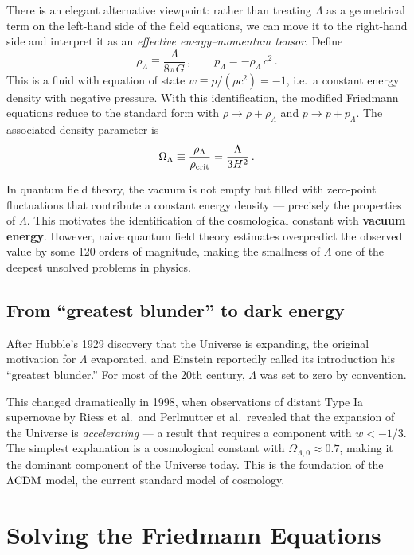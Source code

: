 There is an elegant alternative viewpoint: rather than treating $\Lambda$ as a geometrical term on the left-hand side of the field equations, we can move it to the right-hand side and interpret it as an \emph{effective energy--momentum tensor}. Define
\begin{equation}
    \rho_\Lambda \equiv \frac{\Lambda}{8\pi G}\,, \qquad p_\Lambda = -\rho_\Lambda\, c^2\,.
\end{equation}
This is a fluid with equation of state $w \equiv p/(\rho c^2) = -1$, i.e.\ a constant energy density with negative pressure. With this identification, the modified Friedmann equations reduce to the standard form with $\rho\to\rho+\rho_\Lambda$ and $p\to p+p_\Lambda$. The associated density parameter is
\begin{equation}
    \Omega_\Lambda \equiv \frac{\rho_\Lambda}{\rho_{\rm crit}} = \frac{\Lambda}{3H^2}\,.
\end{equation}

In quantum field theory, the vacuum is not empty but filled with zero-point fluctuations that contribute a constant energy density --- precisely the properties of $\Lambda$. This motivates the identification of the cosmological constant with \textbf{vacuum energy}. However, naive quantum field theory estimates overpredict the observed value by some 120 orders of magnitude, making the smallness of $\Lambda$ one of the deepest unsolved problems in physics.

\subsection*{From ``greatest blunder'' to dark energy}

After Hubble's 1929 discovery that the Universe is expanding, the original motivation for $\Lambda$ evaporated, and Einstein reportedly called its introduction his ``greatest blunder.'' For most of the 20th century, $\Lambda$ was set to zero by convention.

This changed dramatically in 1998, when observations of distant Type Ia supernovae by Riess et al.\ and Perlmutter et al.\ revealed that the expansion of the Universe is \emph{accelerating} --- a result that requires a component with $w<-1/3$. The simplest explanation is a cosmological constant with $\Omega_{\Lambda,0}\approx 0.7$, making it the dominant component of the Universe today. This is the foundation of the $\Lambda\mathrm{CDM}$ model, the current standard model of cosmology.


\section{Solving the Friedmann Equations}


